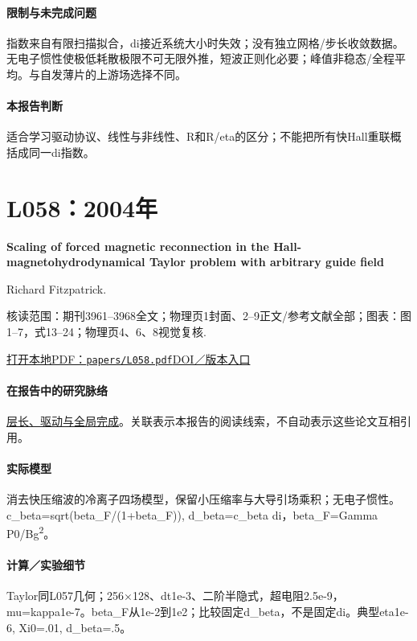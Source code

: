 \documentclass[UTF8,a4paper,11pt,openany,fontset=fandol]{ctexbook}
\begin{document}
\paragraph{限制与未完成问题}指数来自有限扫描拟合，di接近系统大小时失效；没有独立网格/步长收敛数据。无电子惯性使极低耗散极限不可无限外推，短波正则化必要；峰值非稳态/全程平均。与自发薄片的上游场选择不同。

\paragraph{本报告判断}适合学习驱动协议、线性与非线性、R和R/eta的区分；不能把所有快Hall重联概括成同一di指数。

\section{L058：2004年}\label{paper:L058}

\textbf{Scaling of forced magnetic reconnection in the Hall-magnetohydrodynamical Taylor problem with arbitrary guide field}\citep{L058}\

Richard Fitzpatrick.

\textsf{核读范围：}期刊3961–3968全文；物理页1封面、2–9正文/参考文献全部；\textsf{图表：}图1–7，式13–24；物理页4、6、8视觉复核.

\href{run:../papers/L058.pdf}{打开本地PDF：\texttt{papers/L058.pdf}}\quad\href{https://doi.org/10.1063/1.1768956}{DOI／版本入口}

\paragraph{在报告中的研究脉络}\hyperref[story:global]{层长、驱动与全局完成}。关联表示本报告的阅读线索，不自动表示这些论文互相引用。

\paragraph{实际模型}消去快压缩波的冷离子四场模型，保留小压缩率与大导引场乘积；无电子惯性。c\_beta=sqrt(beta\_F/(1+beta\_F)), d\_beta=c\_beta di，beta\_F=Gamma P0/Bg\textsuperscript{2}。

\paragraph{计算／实验细节}Taylor同L057几何；256×128、dt1e-3、二阶半隐式，超电阻2.5e-9，mu=kappa1e-7。beta\_F从1e-2到1e2；比较固定d\_beta，不是固定di。典型eta1e-6, Xi0=.01, d\_beta=.5。
\end{document}
